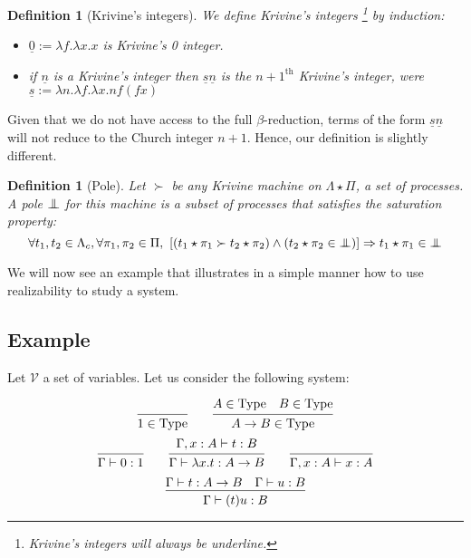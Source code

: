 \documentclass[a4paper,12pt]{article}
\newtheorem{defi}[theo]{Definition}
\theoremstyle{rmqstyle}
\renewcommand{\implies}{\Rightarrow}
\newcommand{\type}{\mathrm{Type}}
\newcommand{\pole}{{\protect\mathpalette{\protect\polehelper}{\bot}}} \def\polehelper#1#2{\mathrel{\rlap{$#1#2$}\mkern3mu{#1#2}}}
\newcommand{\Kri}[1]{\underline{#1}}
\begin{document}
\begin{defi}[Krivine's integers]
We define Krivine's integers \footnote{Krivine's integers will always be underline.} by induction:
\begin{itemize}
\setlength\itemsep{ -1 em}
\item $\Kri{0} := \lambda f. \lambda x. x$ is Krivine's 0 integer.\\
\item if $\Kri{n}$ is a Krivine's integer then $\Kri{s} \Kri{n}$ is the $n+1^{\text{th}}$ Krivine's integer, were $\Kri{s} := \lambda n. \lambda f. \lambda x. nf(fx)$
\end{itemize}
\end{defi}

Given that we do not have access to the full $\beta$-reduction, terms of the form $\Kri{s} \Kri{n}$ will not reduce to the Church integer $n+1$. Hence, our definition is slightly different.

\begin{defi}[Pole]
Let $\succ$ be any Krivine machine on $\Lambda \star \Pi$, a set of processes. A pole $\pole$ for this machine is a subset of processes that satisfies the saturation property:
 $$\forall t_1, t_2 \in \Lambda_c, \forall \pi_1, \pi_2 \in \Pi, \ [(t_1 \star \pi_1 \succ t_2 \star \pi_2) \land  (t_2 \star \pi_2 \in \pole)] \implies t_1 \star \pi_1 \in \pole$$
\end{defi}

We will now see an example that illustrates in a simple manner how to use realizability to study a system.

\clearpage
\subsection{Example}

Let $\mathcal{V}$ a set of variables. Let us consider the following system:

$$
\begin{prooftree}[center=false]
\infer0{1 \in \type}
\end{prooftree}
\qquad
\begin{prooftree}[center=false]
\hypo{A \in \type \quad B \in \type}
\infer1{A \to B \in \type}
\end{prooftree}
$$
\vspace{0.5 em}
$$
\begin{prooftree}[center=false]
\infer0{\Gamma \vdash 0 : 1}
\end{prooftree}
\qquad
\begin{prooftree}[center=false]
\hypo{\Gamma, x : A \vdash t : B}
\infer1{\Gamma \vdash \lambda x.t : A \to B}
\end{prooftree}
\qquad
\begin{prooftree}[center=false]
\infer0{\Gamma, x : A \vdash x : A}
\end{prooftree}
$$
\vspace{0.5 em}
$$
\begin{prooftree}[center=false]
\hypo{\Gamma \vdash t : A \to B \quad \Gamma \vdash u : B}
\infer1{\Gamma \vdash (t)u : B}
\end{prooftree}
$$
\end{document}
